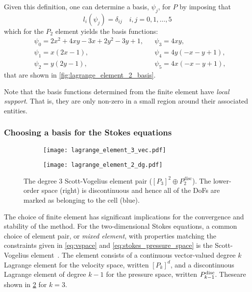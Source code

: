 \documentclass[thesis]{subfiles}
\begin{document}
Given this definition, one can determine a basis, $\psi_j$, for $P$ by imposing that
\begin{equation}
  l_i(\psi_j) = \delta_{ij} \quad i, j = 0, 1, \dots, 5
\end{equation}
which for the $P_2$ element yields the basis functions:
\begin{align*}
  &\psi_0 = 2x^2 + 4xy - 3x + 2y^2-3y+1,
  &
  &\psi_3 = 4xy, \\
  &\psi_1 = x(2x-1),
  &
  &\psi_4 = 4y(-x-y+1), \\
  &\psi_2 = y(2y-1),
  &
  &\psi_5 = 4x(-x-y+1),
\end{align*}
that are shown in \cref{fig:lagrange_element_2_basis}.

Note that the basis functions determined from the finite element have \emph{local support}.
That is, they are only non-zero in a small region around their associated entities.

\subsubsection{Choosing a basis for the Stokes equations}

\begin{figure}
  \centering
  \begin{subfigure}{.35\textwidth}
    \centering
    \texttt{[image: lagrange\_element\_3\_vec.pdf]}
    \label{fig:scott_vogelius_element_P3}
  \end{subfigure}
  \begin{subfigure}{.35\textwidth}
    \centering
    \texttt{[image: lagrange\_element\_2\_dg.pdf]}
  \end{subfigure}
  \caption{
    The degree 3 Scott-Vogelius element pair ($[P_3]^2 \oplus P_2^\mathrm{disc}$).
    The lower-order space (right) is discontinuous and hence all of the DoFs are marked as belonging to the cell (blue).
  }
  \label{fig:scott_vogelius_element}
\end{figure}

The choice of finite element has significant implications for the convergence and stability of the method.
For the two-dimensional Stokes equations, a common choice of element pair, or \emph{mixed element}, with properties matching the constraints given in \cref{eq:vspace} and \cref{eq:stokes_pressure_space} is the Scott-Vogelius element~\cite{scottNormEstimatesMaximal1985}.
The element consists of a continuous vector-valued degree $k$ Lagrange element for the velocity space, written $[P_k]^d$, and a discontinuous Lagrange element of degree $k-1$ for the pressure space, written $P_{k-1}^{\textnormal{disc}}$.
These\footnotemark are shown in \cref{fig:scott_vogelius_element} for $k = 3$.
\end{document}
